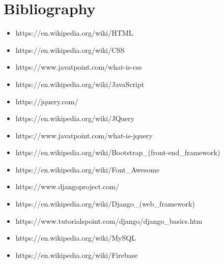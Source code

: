 \documentclass{article}
\begin{document}
	\section{Bibliography}
	\begin{itemize}
		\item https://en.wikipedia.org/wiki/HTML
		\item https://en.wikipedia.org/wiki/CSS
		\item https://www.javatpoint.com/what-is-css
		\item https://en.wikipedia.org/wiki/JavaScript
		\item https://jquery.com/
		\item https://en.wikipedia.org/wiki/JQuery
		\item https://www.javatpoint.com/what-is-jquery
		\item https://en.wikipedia.org/wiki/Bootstrap\_(front-end\_framework)
		\item https://en.wikipedia.org/wiki/Font\_Awesome
		\item https://www.djangoproject.com/
		\item https://en.wikipedia.org/wiki/Django\_(web\_framework)
		\item https://www.tutorialspoint.com/django/django\_basics.htm
		\item https://en.wikipedia.org/wiki/MySQL
		\item https://en.wikipedia.org/wiki/Firebase
	\end{itemize}
\end{document}
